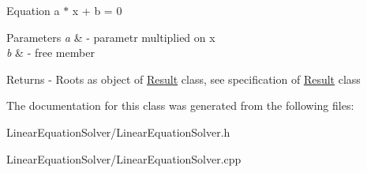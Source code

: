 Equation a $\ast$ x + b = 0 
\begin{DoxyParams}{Parameters}
{\em a} & -\/ parametr multiplied on x \\
\hline
{\em b} & -\/ free member \\
\hline
\end{DoxyParams}
\begin{DoxyReturn}{Returns}
-\/ Roots as object of \hyperlink{classResult}{Result} class, see specification of \hyperlink{classResult}{Result} class 
\end{DoxyReturn}


The documentation for this class was generated from the following files\+:\begin{DoxyCompactItemize}
\item 
Linear\+Equation\+Solver/Linear\+Equation\+Solver.\+h\item 
Linear\+Equation\+Solver/Linear\+Equation\+Solver.\+cpp\end{DoxyCompactItemize}

